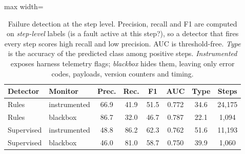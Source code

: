 \begin{table}[t]
\centering\small
\caption{Failure detection at the step level. Precision, recall and F1 are
computed on \emph{step-level} labels (is a fault active at this step?), so a
detector that fires every step scores high recall and low precision. AUC is
threshold-free. \emph{Type} is the accuracy of the predicted class among
positive steps. \emph{Instrumented} exposes harness telemetry flags;
\emph{blackbox} hides them, leaving only error codes, payloads, version
counters and timing.}
\label{tab:detection}
\begin{adjustbox}{max width=\textwidth}
\begin{tabular}{@{}llcccccc@{}}
\toprule
Detector & Monitor & Prec. & Rec. & F1 & AUC & Type & Steps \\
\midrule
Rules & instrumented & 66.9 & 41.9 & 51.5 & 0.772 & 34.6 & 24,175 \\
Rules & blackbox & 86.7 & 32.0 & 46.7 & 0.787 & 22.1 & 1,094 \\
Supervised & instrumented & 48.8 & 86.2 & 62.3 & 0.762 & 51.6 & 11,193 \\
Supervised & blackbox & 46.0 & 81.0 & 58.7 & 0.750 & 39.9 & 1,060 \\
\bottomrule
\end{tabular}
\end{adjustbox}
\end{table}
